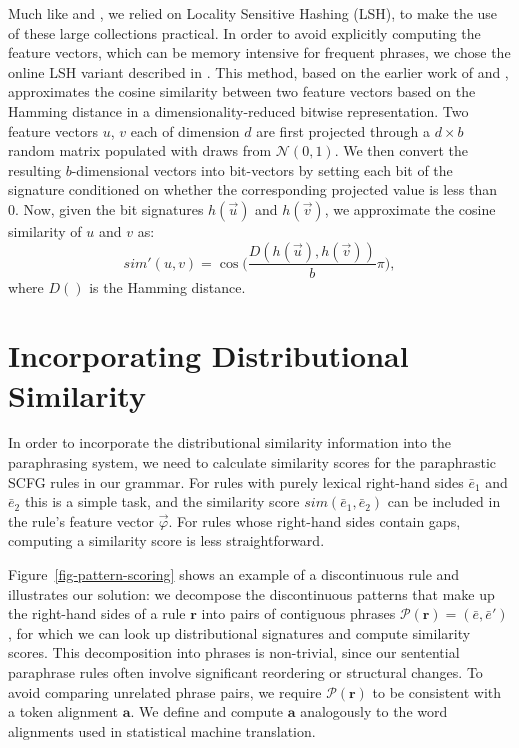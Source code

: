 \documentclass[11pt]{article}
\begin{document}
Much like  and , we
relied on Locality Sensitive Hashing (LSH), to make the use of these
large collections practical. In order to avoid explicitly computing
the feature vectors, which can be memory intensive for frequent
phrases, we chose the online LSH variant described in
\cite{VanDurmeLallACL10}. This method, based on the earlier work of
 and , approximates the
cosine similarity between two feature vectors based on the Hamming
distance in a dimensionality-reduced bitwise representation. Two
feature vectors $u$, $v$ each of dimension $d$ are first projected
through a $d \times b$ random matrix populated with draws from
$\mathcal{N}(0,1)$. We then convert the resulting $b$-dimensional
vectors into bit-vectors by setting each bit of the signature
conditioned on whether the corresponding projected value is less than
0. Now, given the bit signatures $h(\vec{u})$ and $h(\vec{v})$, we
approximate the cosine similarity of $u$ and $v$ as:
\begin{equation*}
  \mathit{sim'}(u, v) =
  \cos\Big(\frac{D(h(\vec{u}),h(\vec{v}))}{b}\pi\Big) ,
\end{equation*}
where $D()$ is the Hamming distance.


\section{Incorporating Distributional Similarity}
\label{sec-scoring}

In order to incorporate the distributional similarity information into
the paraphrasing system, we need to calculate similarity scores for
the paraphrastic SCFG rules in our grammar. For rules with purely
lexical right-hand sides $\bar{e}_1$ and $\bar{e}_2$ this is a simple
task, and the similarity score $\mathit{sim}(\bar{e}_1, \bar{e}_2)$
can be included in the rule's feature vector $\vec{\varphi}$. For
rules whose right-hand sides contain gaps, computing a similarity
score is less straightforward.

Figure~\ref{fig-pattern-scoring} shows an example of a discontinuous
rule and illustrates our solution: we decompose the discontinuous
patterns that make up the right-hand sides of a rule $\mathbf{r}$ into
pairs of contiguous phrases $\mathcal{P}(\mathbf{r}) = (\bar{e},
\bar{e}')$, for which we can look up distributional signatures and
compute similarity scores. This decomposition into phrases is
non-trivial, since our sentential paraphrase rules often involve
significant reordering or structural changes. To avoid comparing
unrelated phrase pairs, we require $\mathcal{P}(\mathbf{r})$ to be
consistent with a token alignment $\mathbf{a}$. We define and compute
$\mathbf{a}$ analogously to the word alignments used in statistical
machine translation.
\end{document}
